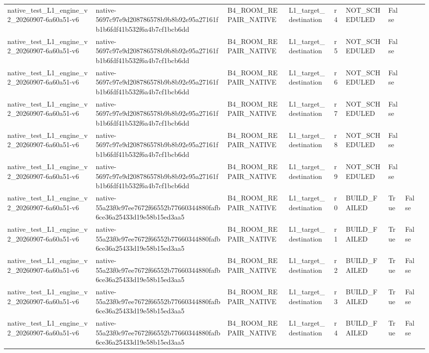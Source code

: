 \begin{tabular}{lllllllll}
native\_test\_L1\_engine\_v2\_20260907-6a60a51-v6 & native-5697c97e9d208786578b9b8b92e95a27161fb1b6fdf41b532f6a4b7cf1bcb6dd & B4\_ROOM\_REPAIR\_NATIVE & L1\_target\_destination & r4 & NOT\_SCHEDULED & False &  &  \\
native\_test\_L1\_engine\_v2\_20260907-6a60a51-v6 & native-5697c97e9d208786578b9b8b92e95a27161fb1b6fdf41b532f6a4b7cf1bcb6dd & B4\_ROOM\_REPAIR\_NATIVE & L1\_target\_destination & r5 & NOT\_SCHEDULED & False &  &  \\
native\_test\_L1\_engine\_v2\_20260907-6a60a51-v6 & native-5697c97e9d208786578b9b8b92e95a27161fb1b6fdf41b532f6a4b7cf1bcb6dd & B4\_ROOM\_REPAIR\_NATIVE & L1\_target\_destination & r6 & NOT\_SCHEDULED & False &  &  \\
native\_test\_L1\_engine\_v2\_20260907-6a60a51-v6 & native-5697c97e9d208786578b9b8b92e95a27161fb1b6fdf41b532f6a4b7cf1bcb6dd & B4\_ROOM\_REPAIR\_NATIVE & L1\_target\_destination & r7 & NOT\_SCHEDULED & False &  &  \\
native\_test\_L1\_engine\_v2\_20260907-6a60a51-v6 & native-5697c97e9d208786578b9b8b92e95a27161fb1b6fdf41b532f6a4b7cf1bcb6dd & B4\_ROOM\_REPAIR\_NATIVE & L1\_target\_destination & r8 & NOT\_SCHEDULED & False &  &  \\
native\_test\_L1\_engine\_v2\_20260907-6a60a51-v6 & native-5697c97e9d208786578b9b8b92e95a27161fb1b6fdf41b532f6a4b7cf1bcb6dd & B4\_ROOM\_REPAIR\_NATIVE & L1\_target\_destination & r9 & NOT\_SCHEDULED & False &  &  \\
native\_test\_L1\_engine\_v2\_20260907-6a60a51-v6 & native-55a23f0c97ee7672f66552b77660344880fafb6ce36a25433d19e58b15ed3aa5 & B4\_ROOM\_REPAIR\_NATIVE & L1\_target\_destination & r0 & BUILD\_FAILED & True & False &  \\
native\_test\_L1\_engine\_v2\_20260907-6a60a51-v6 & native-55a23f0c97ee7672f66552b77660344880fafb6ce36a25433d19e58b15ed3aa5 & B4\_ROOM\_REPAIR\_NATIVE & L1\_target\_destination & r1 & BUILD\_FAILED & True & False &  \\
native\_test\_L1\_engine\_v2\_20260907-6a60a51-v6 & native-55a23f0c97ee7672f66552b77660344880fafb6ce36a25433d19e58b15ed3aa5 & B4\_ROOM\_REPAIR\_NATIVE & L1\_target\_destination & r2 & BUILD\_FAILED & True & False &  \\
native\_test\_L1\_engine\_v2\_20260907-6a60a51-v6 & native-55a23f0c97ee7672f66552b77660344880fafb6ce36a25433d19e58b15ed3aa5 & B4\_ROOM\_REPAIR\_NATIVE & L1\_target\_destination & r3 & BUILD\_FAILED & True & False &  \\
native\_test\_L1\_engine\_v2\_20260907-6a60a51-v6 & native-55a23f0c97ee7672f66552b77660344880fafb6ce36a25433d19e58b15ed3aa5 & B4\_ROOM\_REPAIR\_NATIVE & L1\_target\_destination & r4 & BUILD\_FAILED & True & False &  \\

\end{tabular}

